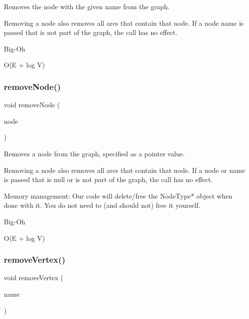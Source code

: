 Removes the node with the given name from the graph. 

Removing a node also removes all arcs that contain that node. If a node name is passed that is not part of the graph, the call has no effect. \begin{DoxyRefDesc}{Big-\/\+Oh}
\item[\mbox{\hyperlink{BigOh__BigOh000087}{Big-\/\+Oh}}]O(E + log V) \end{DoxyRefDesc}
\mbox{\label{classGraph_a2dfe63019975561914e0ed79551de108}} 
\subsubsection{\texorpdfstring{remove\+Node()}{removeNode()}\hspace{0.1cm}{\footnotesize\ttfamily [2/2]}}
{\footnotesize\ttfamily void remove\+Node (\begin{DoxyParamCaption}\item[{\mbox{\hyperlink{classVertexGen}{Vertex\+Gen}}$<$ V, E $>$  $\ast$}]{node }\end{DoxyParamCaption})\hspace{0.3cm}{\ttfamily [inherited]}}



Removes a node from the graph, specified as a pointer value. 

Removing a node also removes all arcs that contain that node. If a node or name is passed that is null or is not part of the graph, the call has no effect.

Memory management\+: Our code will delete/free the Node\+Type$\ast$ object when done with it. You do not need to (and should not) free it yourself. \begin{DoxyRefDesc}{Big-\/\+Oh}
\item[\mbox{\hyperlink{BigOh__BigOh000088}{Big-\/\+Oh}}]O(E + log V) \end{DoxyRefDesc}
\mbox{\label{classBasicGraphGen_aaa33b4c05ee490d241ba5542420b985b}} 
\subsubsection{\texorpdfstring{remove\+Vertex()}{removeVertex()}\hspace{0.1cm}{\footnotesize\ttfamily [1/2]}}
{\footnotesize\ttfamily void remove\+Vertex (\begin{DoxyParamCaption}\item[{const std\+::string \&}]{name }\end{DoxyParamCaption})}




